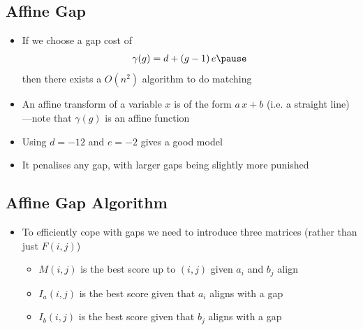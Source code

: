 
\begin{slide}
\section{Affine Gap}

\begin{PauseHighLight}
  \begin{itemize}
  \item If we choose a gap cost of
    \begin{align*}
      \gamma(g) = d + (g-1)\,e\pause
    \end{align*}
    then there exists a $O(n^2)$ algorithm to do matching\pause
  \item An affine transform of a variable $x$ is of the form $a\,x +b$
    (i.e. a straight line)\pause---note that $\gamma(g)$ is an affine
    function\pause
  \item Using $d=-12$ and $e=-2$ gives a good model\pause
  \item It penalises any gap, with larger gaps being slightly more
    punished\pause
  \end{itemize}
\end{PauseHighLight}

\end{slide}


\begin{slide}
\section{Affine Gap Algorithm}

\begin{PauseHighLight}
  \begin{itemize}
  \item To efficiently cope with gaps we need to introduce three
    matrices (rather than just $F(i,j)$)\pause
    \begin{itemize}
    \item $M(i,j)$ is the best score up to $(i,j)$ given $a_i$ and $b_j$
      align\pause
    \item $I_a(i,j)$ is the best score given that $a_i$ aligns with a gap\pause
    \item $I_b(i,j)$ is the best score given that $b_j$ aligns with a gap\pause
    \end{itemize}
  \end{itemize}
\end{PauseHighLight}

\end{slide}

